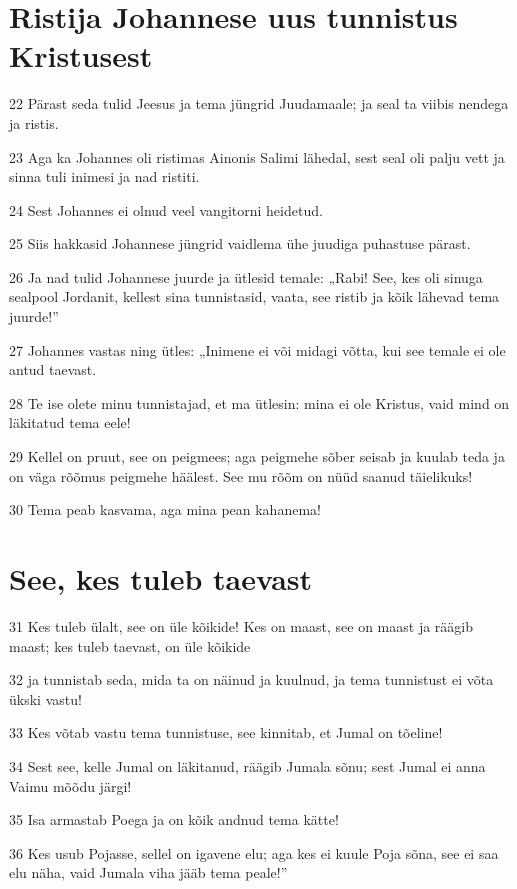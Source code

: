 \section*{Ristija Johannese uus tunnistus Kristusest}

\par 22 Pärast seda tulid Jeesus ja tema jüngrid Juudamaale; ja seal ta viibis nendega ja ristis.
\par 23 Aga ka Johannes oli ristimas Ainonis Salimi lähedal, sest seal oli palju vett ja sinna tuli inimesi ja nad ristiti.
\par 24 Sest Johannes ei olnud veel vangitorni heidetud.
\par 25 Siis hakkasid Johannese jüngrid vaidlema ühe juudiga puhastuse pärast.
\par 26 Ja nad tulid Johannese juurde ja ütlesid temale: „Rabi! See, kes oli sinuga sealpool Jordanit, kellest sina tunnistasid, vaata, see ristib ja kõik lähevad tema juurde!”
\par 27 Johannes vastas ning ütles: „Inimene ei või midagi võtta, kui see temale ei ole antud taevast.
\par 28 Te ise olete minu tunnistajad, et ma ütlesin: mina ei ole Kristus, vaid mind on läkitatud tema eele!
\par 29 Kellel on pruut, see on peigmees; aga peigmehe sõber seisab ja kuulab teda ja on väga rõõmus peigmehe häälest. See mu rõõm on nüüd saanud täielikuks!
\par 30 Tema peab kasvama, aga mina pean kahanema!

\section*{See, kes tuleb taevast}

\par 31 Kes tuleb ülalt, see on üle kõikide! Kes on maast, see on maast ja räägib maast; kes tuleb taevast, on üle kõikide
\par 32 ja tunnistab seda, mida ta on näinud ja kuulnud, ja tema tunnistust ei võta ükski vastu!
\par 33 Kes võtab vastu tema tunnistuse, see kinnitab, et Jumal on tõeline!
\par 34 Sest see, kelle Jumal on läkitanud, räägib Jumala sõnu; sest Jumal ei anna Vaimu mõõdu järgi!
\par 35 Isa armastab Poega ja on kõik andnud tema kätte!
\par 36 Kes usub Pojasse, sellel on igavene elu; aga kes ei kuule Poja sõna, see ei saa elu näha, vaid Jumala viha jääb tema peale!”


